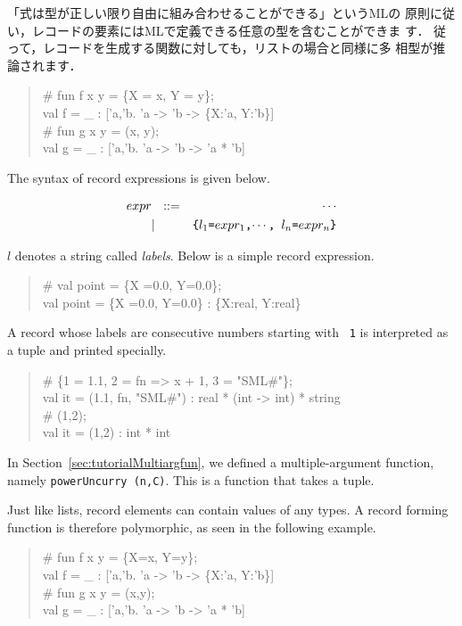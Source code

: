 \documentclass{jbook}
\newenvironment{program}{\begin{quote}\begin{tt}}%
                        {\end{tt}\end{quote}}
\begin{document}
	「式は型が正しい限り自由に組み合わせることができる」というMLの
原則に従い，レコードの要素にはMLで定義できる任意の型を含むことができま
す．
	従って，レコードを生成する関数に対しても，リストの場合と同様に多
相型が推論されます．
\begin{program}
\# fun f x y = \{X = x, Y = y\};\\
val f = \_ : ['a,'b. 'a -> 'b -> \{X:'a, Y:'b\}]\\
\# fun g x y = (x, y);\\
val g = \_ : ['a,'b. 'a -> 'b -> 'a * 'b]
\end{program}
\else%
	The syntax of record expressions is given below.
\begin{tt}
\begin{eqnarray*}
expr &\mbox{\ \ }::=& \cdots \\
     &|& \mbox{\tt \{$l_1$=$expr_1$,$\cdots$, $l_n$=$expr_n$\}}
\end{eqnarray*}
\end{tt}
	$l$ denotes a string called {\em labels}.
	Below is a simple record expression.
\begin{program}
\# val point = \{X =0.0, Y=0.0\};\\
val point = \{X =0.0, Y=0.0\} : \{X:real, Y:real\}
\end{program}
	A record whose labels are consecutive numbers starting with {\tt
1} is interpreted as a tuple and printed specially.
\begin{program}
\#  \{1 = 1.1, 2 = fn => x + 1, 3 = "SML\#"\};\\
val it = (1.1, fn, "SML\#") : real * (int -> int) * string\\
\# (1,2);\\
val it = (1,2) : int * int
\end{program}
	In Section~\ref{sec:tutorialMultiargfun}, we defined a
multiple-argument function, namely {\tt powerUncurry (n,C)}.
	This is a function that takes a tuple.

	Just like lists, record elements can contain values of any
types.
	A record forming function is therefore polymorphic, as seen in
the following example.
\begin{program}
\# fun f x y = \{X=x, Y=y\};\\
val f = \_ : ['a,'b. 'a -> 'b -> \{X:'a, Y:'b\}]\\
\# fun g x y = (x,y);\\
val g = \_ : ['a,'b. 'a -> 'b -> 'a * 'b]
\end{program}
\fi%
\end{document}
